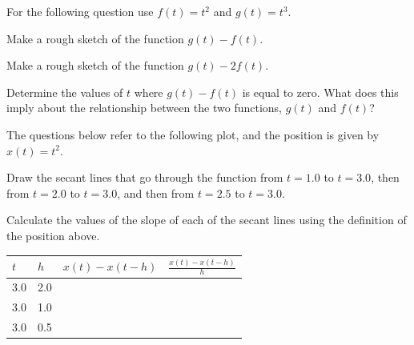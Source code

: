 \begin{problem}
\item For the following question use $f(t)=t^2$ and $g(t)=t^3$.
  \begin{subproblem}
  \item Make a rough sketch of the function $g(t)-f(t)$.  

    \vfill

  \item Make a rough sketch of the function $g(t)-2f(t)$.  

    \vfill

  \item Determine the values of $t$ where $g(t)-f(t)$ is equal to
    zero. What does this imply about the relationship between the two
    functions, $g(t)$ and $f(t)$?

    \vspace{3em}

  \end{subproblem}

  \clearpage

\item The questions below refer to the following plot, and the
  position is given by $x(t)=t^2$.

  \scalebox{0.7}{}

  \begin{subproblem}
    \item Draw the secant lines that go through the function from
      $t=1.0$ to $t=3.0$, then from $t=2.0$ to $t=3.0$, and then from
      $t=2.5$ to $t=3.0$.
    \item Calculate the values of the slope of each of the secant
      lines using the definition of the position above.

      \begin{tabular}{l|l|l|l}
        $t$ & $h$ & $x(t)-x(t-h)$ & $\frac{x(t)-x(t-h)}{h}$ \\ \hline
        3.0 & 2.0 & & \\ [15pt]
        3.0 & 1.0 & & \\ [15pt]
        3.0 & 0.5 & & \\ [15pt]
      \end{tabular}

  \end{subproblem}


\end{problem}

